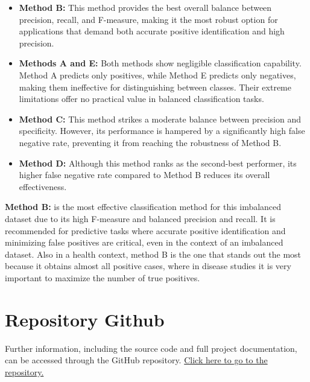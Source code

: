 \documentclass{llncs}
\begin{document}
\begin{itemize}
	\item \textbf{Method B:} This method provides the best overall balance between precision, recall, and F-measure, making it the most robust option for applications that demand both accurate positive identification and high precision.
	
	\item \textbf{Methods A and E:} Both methods show negligible classification capability. Method A predicts only positives, while Method E predicts only negatives, making them ineffective for distinguishing between classes. Their extreme limitations offer no practical value in balanced classification tasks.
	
	\item \textbf{Method C:} This method strikes a moderate balance between precision and specificity. However, its performance is hampered by a significantly high false negative rate, preventing it from reaching the robustness of Method B.
	
	\item \textbf{Method D:} Although this method ranks as the second-best performer, its higher false negative rate compared to Method B reduces its overall effectiveness.
\end{itemize}

\textbf{Method B:} is the most effective classification method for this imbalanced dataset due to its high F-measure and balanced precision and recall. It is recommended for predictive tasks where accurate positive identification and minimizing false positives are critical, even in the context of an imbalanced dataset. Also in a health context, method B is the one that stands out the most because it obtains almost all positive cases, where in disease studies it is very important to maximize the number of true positives.

\section{Repository Github}
Further information, including the source code and full project documentation, can be accessed through the GitHub repository.  \href{https://github.com/Diegodepab/Supervised_Learning_Model_Evaluation_Metrics}{Click here to go to the repository.} 



\end{document}
